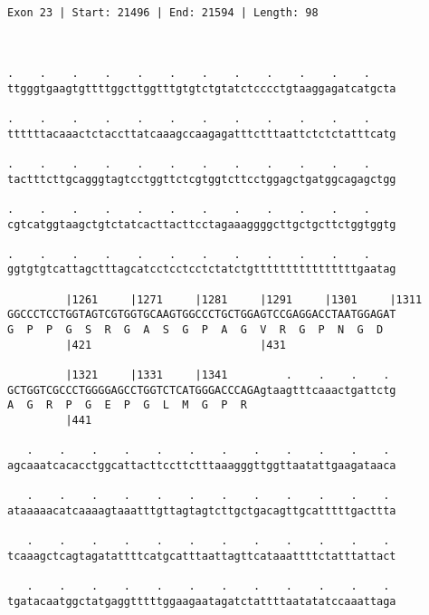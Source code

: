 \documentclass{article}
\begin{document}
\begin{Verbatim}
                                                       
 
Exon 23 | Start: 21496 | End: 21594 | Length: 98



.    .    .    .    .    .    .    .    .    .    .    .    
ttgggtgaagtgttttggcttggtttgtgtctgtatctcccctgtaaggagatcatgcta
                                                            
.    .    .    .    .    .    .    .    .    .    .    .    
ttttttacaaactctaccttatcaaagccaagagatttctttaattctctctatttcatg
                                                            
.    .    .    .    .    .    .    .    .    .    .    .    
tactttcttgcagggtagtcctggttctcgtggtcttcctggagctgatggcagagctgg
                                                            
.    .    .    .    .    .    .    .    .    .    .    .    
cgtcatggtaagctgtctatcacttacttcctagaaaggggcttgctgcttctggtggtg
                                                            
.    .    .    .    .    .    .    .    .    .    .    .    
ggtgtgtcattagctttagcatcctcctcctctatctgttttttttttttttttgaatag
                                                            
         |1261     |1271     |1281     |1291     |1301     |1311
GGCCCTCCTGGTAGTCGTGGTGCAAGTGGCCCTGCTGGAGTCCGAGGACCTAATGGAGAT
G  P  P  G  S  R  G  A  S  G  P  A  G  V  R  G  P  N  G  D  
         |421                          |431                 
  
         |1321     |1331     |1341         .    .    .    . 
GCTGGTCGCCCTGGGGAGCCTGGTCTCATGGGACCCAGAgtaagtttcaaactgattctg
A  G  R  P  G  E  P  G  L  M  G  P  R                       
         |441                                               
  
   .    .    .    .    .    .    .    .    .    .    .    . 
agcaaatcacacctggcattacttccttctttaaagggttggttaatattgaagataaca
                                                            
   .    .    .    .    .    .    .    .    .    .    .    . 
ataaaaacatcaaaagtaaatttgttagtagtcttgctgacagttgcatttttgacttta
                                                            
   .    .    .    .    .    .    .    .    .    .    .    . 
tcaaagctcagtagatattttcatgcatttaattagttcataaattttctatttattact
                                                            
   .    .    .    .    .    .    .    .    .    .    .    . 
tgatacaatggctatgaggtttttggaagaatagatctattttaatatatccaaattaga
                                                            

\end{Verbatim}
\end{document}
